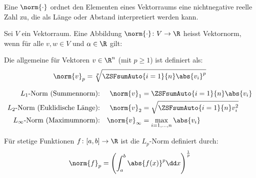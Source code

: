
\begin{runintext}
Eine  $\norm{\cdot}$ ordnet den Elementen eines Vektorraums eine nichtnegative reelle Zahl zu, die als Länge oder Abstand interpretiert werden kann.
\end{runintext}


\begin{defbox}[Vektornorm]
Sei $V$ ein Vektorraum. Eine Abbildung $\norm{\cdot} \colon V \to \R$ heisst Vektornorm, wenn für alle $v, w \in V$ und $\alpha \in \R$ gilt:
  \begin{ZSFlist}[][ordered]
  \end{ZSFlist}
\end{defbox}


\begin{defbox}[$L_p$-Norm]
Die allgemeine  für Vektoren $v \in \R^n$ (mit $p \geq 1$) ist definiert als:
\[ \norm{v}_p = \sqrt[p]{\ZSFsumAuto{i=1}{n} \abs{v_i}^p} \]
\end{defbox}

\begin{formulabox}[Spezialfälle]
  \[
  \begin{aligned}
    L_1\text{-Norm (Summennorm):} && \norm{v}_1 &= \ZSFsumAuto{i=1}{n} \abs{v_i} \\
    L_2\text{-Norm (Euklidische Länge):} && \norm{v}_2 &= \sqrt{\ZSFsumAuto{i=1}{n} v_i^2} \\
    L_\infty\text{-Norm (Maximumnorm):} && \norm{v}_\infty &= \max_{i=1,\dots,n} \abs{v_i}
  \end{aligned}
  \]
\end{formulabox}


\begin{defbox}
Für stetige Funktionen $f \colon [a,b] \to \R$ ist die $L_p$-Norm definiert durch:
\[ \norm{f}_p = \left( \int_{a}^{b} \abs{f(x)}^p \dd x \right)^{\frac{1}{p}} \]
\end{defbox}

